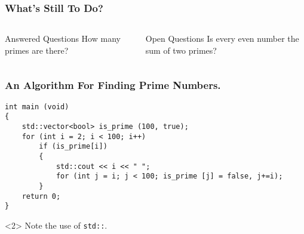 \documentclass{beamer}
\begin{document}
\begin{frame}
\frametitle{What’s Still To Do?}
\begin{columns}
    \begin{block}{Answered Questions}
        How many primes are there?
    \end{block}
    \begin{block}{Open Questions}
        Is every even number the sum of two primes?
    \end{block}
\end{columns}
\end{frame}

\begin{frame}[fragile]
\frametitle{An Algorithm For Finding Prime Numbers.}
\begin{verbatim}
int main (void)
{
    std::vector<bool> is_prime (100, true);
    for (int i = 2; i < 100; i++)
        if (is_prime[i])
        {
            std::cout << i << " ";
            for (int j = i; j < 100; is_prime [j] = false, j+=i);
        }
    return 0;
}
\end{verbatim}
\begin{uncoverenv}<2>
    Note the use of \verb|std::|.
\end{uncoverenv}
\end{frame}
\end{document}
